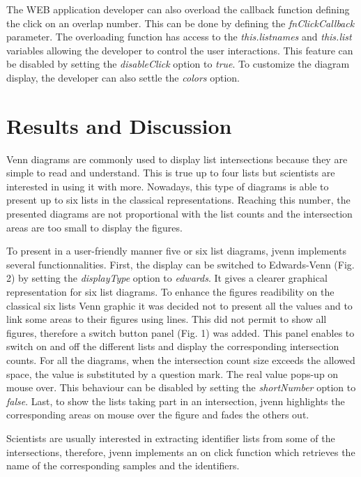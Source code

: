 \documentclass{bmcart}
\begin{document}
The WEB application developer can also overload the callback function defining the click on an overlap number. This can be done by defining 
the \textit{fnClickCallback} parameter. The overloading function has access to the \textit{this.listnames} and \textit{this.list} variables 
allowing the developer to control the user interactions. This feature can be disabled by setting the \textit{disableClick} option to \textit{true}. 
To customize the diagram display, the developer can also settle the \textit{colors} option.


\section*{Results and Discussion}

Venn diagrams are commonly used to display list intersections because they are simple to read and understand. This is true up to four lists but 
scientists are interested in using it with more. Nowadays, this type of diagrams is able to present up to six lists in the classical representations.
Reaching this number, the presented diagrams are not proportional with the list counts and the intersection areas are too small to display the 
figures. 

To present in a user-friendly manner five or six list diagrams, jvenn implements several functionnalities. First, the display can be switched to
Edwards-Venn (Fig. 2) by setting the \textit{displayType} option to \textit{edwards}. It gives a clearer graphical representation for six list
diagrams. To enhance the figures readibility on the classical six lists Venn graphic it was decided not to present all the values and to link some areas
to their figures using lines. This did not permit to show all figures, therefore a switch button panel (Fig. 1) was added. This panel enables 
to switch on and off the different lists and display the corresponding intersection counts. For all the diagrams, when the intersection count size 
exceeds the allowed space, the value is substituted by a question mark. The real value pops-up on mouse over. This behaviour can be disabled by setting 
the \textit{shortNumber} option to \textit{false}. Last, to show the lists taking part in an intersection, jvenn highlights the corresponding areas on
mouse over the figure and fades the others out.

Scientists are usually interested in extracting identifier lists from some of the intersections, therefore, jvenn implements an on click function which 
retrieves the name of the corresponding samples and the identifiers.
\end{document}
